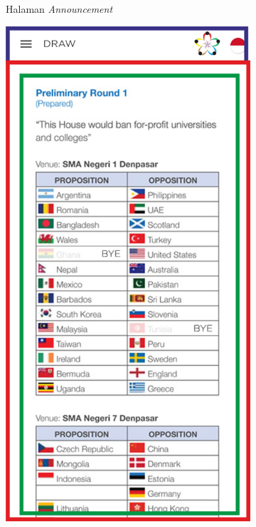 \begin{figure}[H]
\begin{subfigure}[b]{0.21\textwidth}
    	\caption{Halaman \textit{Announcement}}
    	\label{fig:announcementsPageWireframe}
     \end{subfigure}
     \hfill
     \begin{subfigure}[b]{0.247\textwidth}
    \centering
	    \includegraphics[scale=0.4]{Gambar/DrawPageWireframe.png}

\end{subfigure}
\end{figure}
